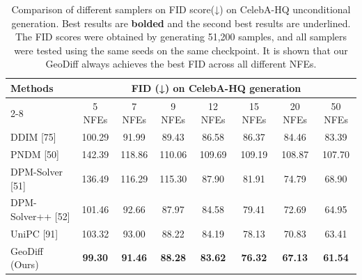 \begin{table}[t]
    \centering
    \footnotesize
    \setlength{\tabcolsep}{2pt}
    \renewcommand{\arraystretch}{0.9}
    \begin{tabular}{l|ccccccc}
    \toprule
    \multirow{2}{*}{Methods} & \multicolumn{7}{c}{FID (↓) on CelebA-HQ generation} \\
    \cmidrule(lr){2-8}
    & 5 NFEs & 7 NFEs & 9 NFEs & 12 NFEs & 15 NFEs & 20 NFEs & 50 NFEs \\
    \midrule
    DDIM [75] & 100.29 & 91.99 & 89.43 & 86.58 & 86.37 & 84.46 & 83.39 \\
    PNDM [50] & 142.39 & 118.86 & 110.06 & 109.69 & 109.19 & 108.87 & 107.70 \\
    DPM-Solver [51] & 136.49 & 116.29 & 115.30 & 87.90 & 81.91 & 74.79 & 68.90 \\
    DPM-Solver++ [52] & 101.46 & 92.66 & 87.97 & 84.58 & 79.41 & 72.69 & 64.95 \\
    UniPC [91] & 103.32 & 93.00 & 88.22 & 84.19 & 78.13 & 70.83 & 63.41 \\
    \midrule
    GeoDiff (Ours) & \textbf{99.30} & \textbf{91.46} & \textbf{88.28} & \textbf{83.62} & \textbf{76.32} & \textbf{67.13} & \textbf{61.54} \\
    \bottomrule
    \end{tabular}
    \caption{Comparison of different samplers on FID score(↓) on CelebA-HQ unconditional generation. Best results are \textbf{bolded} and the second best results are underlined. The FID scores were obtained by generating 51,200 samples, and all samplers were tested using the same seeds on the same checkpoint. It is shown that our GeoDiff always achieves the best FID across all different NFEs.}
    \label{tab_fid_comparison}
\end{table}



